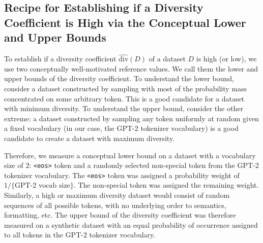 \subsection{Recipe for Establishing if a Diversity Coefficient is High via the Conceptual Lower and Upper Bounds }\label{method_ub_lb}
To establish if a diversity coefficient $\hat{\textrm{div}}(D)$ of a dataset $D$ is high (or low), we use two conceptually well-motivated reference values.
We call them the lower and upper bounds of the diversity coefficient.
To understand the lower bound, consider a dataset constructed by sampling with most of the probability mass concentrated on some arbitrary token.
This is a good candidate for a dataset with minimum diversity.
To understand the upper bound, consider the other extreme: a dataset constructed by sampling any token uniformly at random given a fixed vocabulary (in our case, the GPT-2 tokenizer vocabulary) is a good candidate to create a dataset with maximum diversity.

Therefore, we measure a conceptual lower bound on a dataset with a vocabulary size of $2$: \texttt{<eos>} token and a randomly selected non-special token from the GPT-2 tokenizer vocabulary. 
The \texttt{<eos>} token was assigned a probability weight of $1/\{\text{GPT-2 vocab size}\}$. 
The non-special token was assigned the remaining weight.
Similarly, a high or maximum diversity dataset would consist of random sequences of all possible tokens, with no underlying order to semantics, formatting, etc. 
The upper bound of the diversity coefficient was therefore measured on a synthetic dataset with an equal probability of occurrence assigned to all tokens in the GPT-2 tokenizer vocabulary.


